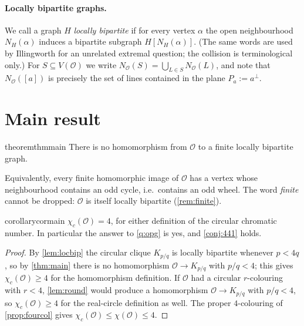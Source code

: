 \documentclass[11pt,a4paper]{article}
\theoremstyle{plain}
\theoremstyle{definition}
\theoremstyle{remark}
\newcommand{\cO}{\mathcal O}
\newcommand{\chic}{\chi_c}
\newcommand{\Kc}[2]{K_{#1/#2}}
\newcommand{\Nb}{N_{\cO}}
\newcommand{\Pl}[1]{P_{#1}}
\begin{document}
\paragraph{Locally bipartite graphs.} We call a graph $H$ \emph{locally bipartite} if for every vertex $\alpha$ the open neighbourhood $N_H(\alpha)$ induces a bipartite subgraph $H[N_H(\alpha)]$. (The same words are used by Illingworth \cite{Ill22} for an unrelated extremal question; the collision is terminological only.) For $S\subseteq V(\cO)$ we write $\Nb(S)=\bigcup_{L\in S}\Nb(L)$, and note that $\Nb([a])$ is precisely the set of lines contained in the plane $\Pl a:=a^\perp$.

\section{Main result}

\begin{restatable}{theorem}{thmmain}\label{thm:main}
There is no homomorphism from $\cO$ to a finite locally bipartite graph.
\end{restatable}

Equivalently, every finite homomorphic image of $\cO$ has a vertex whose neighbourhood contains an odd cycle, i.e.\ contains an odd wheel. The word \emph{finite} cannot be dropped: $\cO$ is itself locally bipartite (\cref{rem:finite}).

\begin{restatable}{corollary}{cormain}\label{cor:main}
$\chic(\cO)=4$, for either definition of the circular chromatic number. In particular the answer to \cref{q:opg} is yes, and \cref{conj:441} holds.
\end{restatable}
\begin{proof}
By \cref{lem:locbip} the circular clique $\Kc pq$ is locally bipartite whenever $p<4q$, so by \cref{thm:main} there is no homomorphism $\cO\to\Kc pq$ with $p/q<4$; this gives $\chic(\cO)\ge4$ for the homomorphism definition. If $\cO$ had a circular $r$-colouring with $r<4$, \cref{lem:round} would produce a homomorphism $\cO\to\Kc pq$ with $p/q<4$, so $\chic(\cO)\ge4$ for the real-circle definition as well. The proper $4$-colouring of \cref{prop:fourcol} gives $\chic(\cO)\le\chi(\cO)\le4$.
\end{proof}
\end{document}
